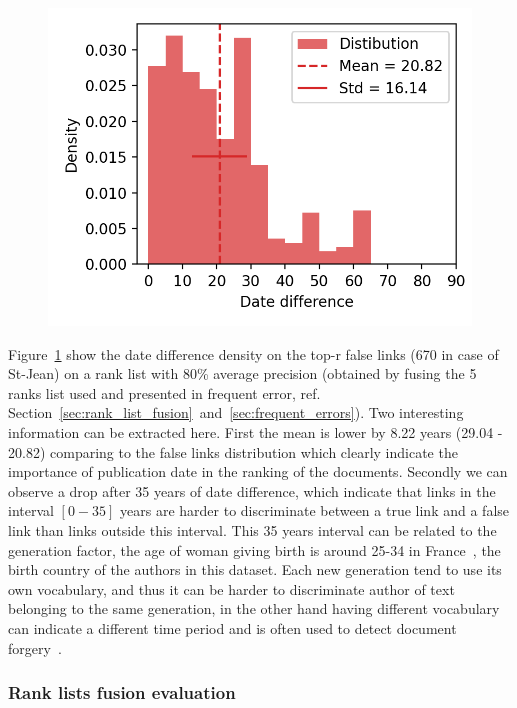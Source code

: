 \begin{figure}
  \label{fig:dates_differences_r_false}
  \includegraphics[width=\linewidth]{img/dates_differences_r_false.png}
\end{figure}

Figure~\ref{fig:dates_differences_r_false} show the date difference density on the top-r false links (670 in case of St-Jean) on a rank list with 80\% average precision (obtained by fusing the 5 ranks list used and presented in frequent error, ref. Section~\ref{sec:rank_list_fusion}~and~\ref{sec:frequent_errors}).
Two interesting information can be extracted here.
First the mean is lower by 8.22 years (29.04 - 20.82) comparing to the false links distribution which clearly indicate the importance of publication date in the ranking of the documents.
Secondly we can observe a drop after 35 years of date difference, which indicate that links in the interval $\left[0-35\right]$ years are harder to discriminate between a true link and a false link than links outside this interval.
This 35 years interval can be related to the generation factor, the age of woman giving birth is around 25-34 in France~\cite{generations}, the birth country of the authors in this dataset.
Each new generation tend to use its own vocabulary, and thus it can be harder to discriminate author of text belonging to the same generation, in the other hand having different vocabulary can indicate a different time period and is often used to detect document forgery~\cite{savoy_stylo}.

\subsubsection{Rank lists fusion evaluation}


